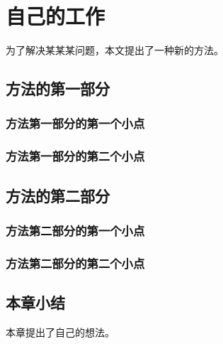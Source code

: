 
\chapter{自己的工作}

为了解决某某某问题，本文提出了一种新的方法。

\section{方法的第一部分}

\subsection{方法第一部分的第一个小点}

\subsection{方法第一部分的第二个小点}

\section{方法的第二部分}

\subsection{方法第二部分的第一个小点}

\subsection{方法第二部分的第二个小点}

\section{本章小结}

本章提出了自己的想法。